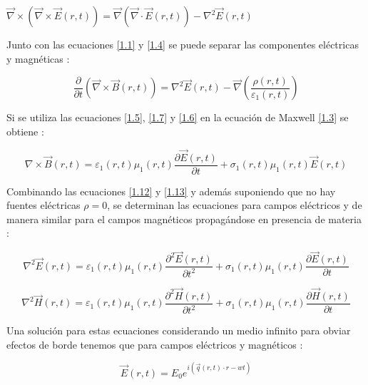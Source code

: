 \documentclass[a4paper,openright,12pt]{book}
\begin{document}
\begin{center}
$\vec{\nabla}\times (\vec{\nabla}\times \vec{E}(r,t))=\vec{\nabla}(\vec{\nabla}\cdot \vec{E}(r,t))-\nabla^{2}\vec{E}(r,t)$\\
\end{center}
Junto con las ecuaciones \ref{1.1} y \ref{1.4} se puede separar las componentes eléctricas y magnéticas \cite{electrodynamics} :

\begin{equation}\label{1.12}
\frac{\partial}{\partial t}(\vec{\nabla} \times \vec{B} (r,t))=\nabla^{2}\vec{E}(r,t)-\vec{\nabla}(\frac{\rho(r,t)}{\varepsilon_{1}(r,t)})
\end{equation}

Si se utiliza las ecuaciones  \ref{1.5}, \ref{1.7} y \ref{1.6} en la ecuación de Maxwell \ref{1.3} se obtiene \cite{electrodynamics}:

\begin{equation}\label{1.13}
\nabla \times \vec{B}(r,t)=\varepsilon
_{1}(r,t)\mu_{1}(r,t)\frac{\partial \vec{E}(r,t)}{\partial t}+\sigma_{1}(r,t)\mu_{1}(r,t)
\vec{E}(r,t)
\end{equation}

Combinando las ecuaciones \ref{1.12} y \ref{1.13} y además suponiendo que no hay fuentes eléctricas $\rho=0$, se determinan las ecuaciones para campos eléctricos y de manera similar para el campos magnéticos propagándose en presencia de materia \cite{electrodynamics}:

\begin{equation}\label{1.14}
\nabla^{2}\vec{E}(r,t)=\varepsilon_{1}(r,t)\mu_{1}(r,t)\frac{\partial^{2}\vec{E}(r,t)}{\partial t^{2}}+{\sigma_{1}(r,t)\mu_{1}(r,t)}\frac{\partial \vec{E}(r,t)}{\partial t}
\end{equation}

\begin{equation}\label{1.15}
\nabla^{2}\vec{H}(r,t)=\varepsilon_{1}(r,t)\mu_{1}(r,t)\frac{\partial^{2}\vec{H}(r,t)}{\partial t^{2}}+\sigma_{1}(r,t)\mu_{1}(r,t) \frac{\partial \vec{H}(r,t)}{\partial t}
\end{equation}

Una solución para estas ecuaciones considerando un medio infinito para obviar efectos de borde tenemos que para campos eléctricos y magnéticos \cite{electrodynamics}:

\begin{equation}\label{1.16}
   \vec{E}(r,t)=E_{0}e^{i(\vec{q}(r,t)\cdot r-wt)}
\end{equation}
\end{document}
